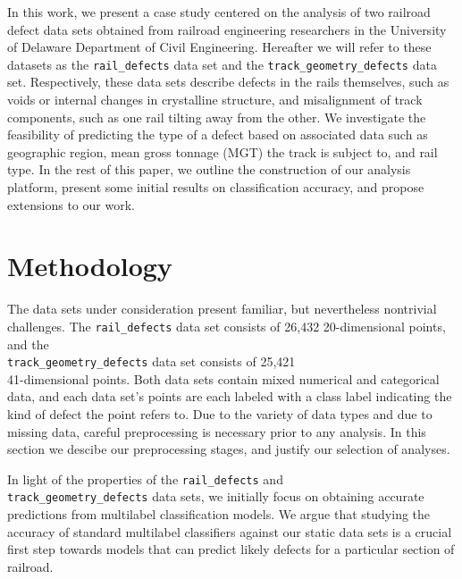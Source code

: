 \documentclass{sig-alternate-05-2015}
\begin{document}
In this work, we present a case study centered on the analysis of two railroad defect data sets
obtained from railroad engineering researchers in the University of Delaware Department of 
Civil Engineering. Hereafter we will refer to these datasets as the \texttt{rail\_defects} data 
set and the \texttt{track\_geometry\_defects} data set. Respectively, these data sets describe 
defects in the rails themselves, such as voids or internal changes in crystalline structure, 
and misalignment of track components, such as one rail tilting away from the other. We 
investigate the feasibility of predicting the type of a defect based on associated data such 
as geographic region, mean gross tonnage (MGT) the track is subject to, and rail type. 
In the rest of this paper, we outline the construction of our analysis platform, present some
initial results on classification accuracy, and propose extensions to our work. 

\section{Methodology}
The data sets under consideration present familiar, but nevertheless nontrivial challenges. The 
\texttt{rail\_defects} data set consists of 26,432 20-dimensional points, and the \\
\texttt{track\_geometry\_defects} data set consists of 25,421 \\ 41-dimensional points. 
Both data sets contain mixed numerical and categorical data, and each data set's points are
each labeled with a class label indicating the kind of defect the point refers to. 
Due to the variety of data types and due to missing data, careful preprocessing is necessary
prior to any analysis. In this section we descibe our preprocessing stages, and justify our
selection of analyses. 

In light of the properties of the \texttt{rail\_defects} and \\
\texttt{track\_geometry\_defects} data sets, we initially focus on obtaining accurate 
predictions from multilabel classification models. We argue that studying the accuracy of
standard multilabel classifiers against our static data sets is a crucial first step towards
models that can predict likely defects for a particular section of railroad. 
\end{document}

